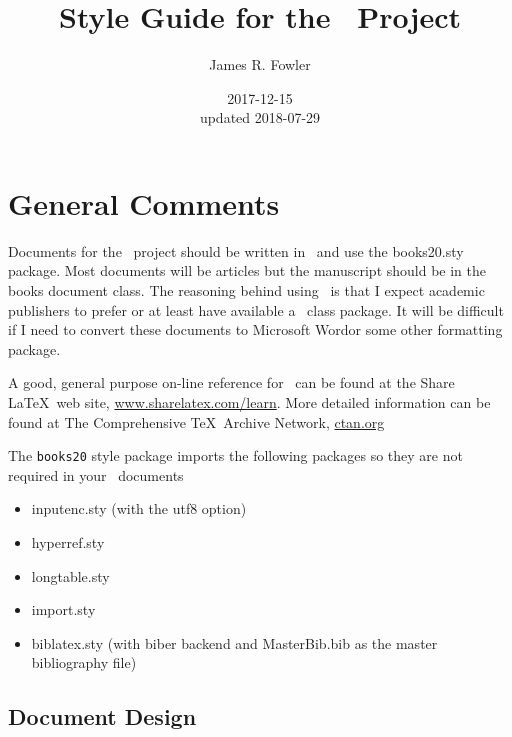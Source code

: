 \documentclass{article}
\begin{document}
\title{Style Guide for the \ProjectTitle\ Project}
\author{James R. Fowler}
\date{2017-12-15\\ updated 2018-07-29}

\maketitle

\section{General Comments}

Documents for the \ProjectTitle\ project should be written in \LaTeXe\ and use
the books20.sty package. Most documents will be articles but the
manuscript should be in the books document class. The reasoning behind
using \LaTeXe\ is that I expect academic publishers to prefer or at
least have available a \LaTeXe\ class package.  It will be difficult if
I need to convert these documents to Microsoft Word\texttrademark or
some other formatting package.

A good, general purpose on-line reference for \LaTeXe\ can be found at
the Share \LaTeX\ web site,
\href{http://www.sharelatex.com/learn}{www.sharelatex.com/learn}.
More detailed information can be found at The Comprehensive
\TeX\ Archive Network, \href{ctan.org}{ctan.org}

The \texttt{books20} style package imports the following packages so they are
not required in your \LaTeXe\ documents

\begin{itemize}
\item inputenc.sty \cite{Jeffrey2018} (with the utf8 option)
\item hyperref.sty \cite{Rahtz2017}
\item longtable.sty \cite{Carlisle2014}
\item import.sty \cite{Arseneau2009}
\item biblatex.sty \cite{Lehman2018} (with biber backend and MasterBib.bib as the master
  bibliography file)
\end{itemize}


\subsection{Document Design}
\end{document}
